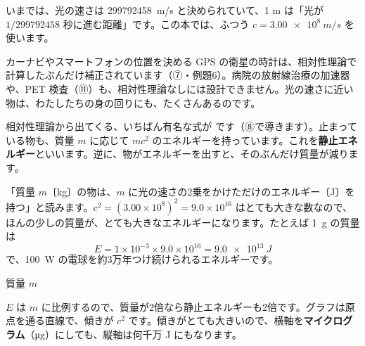 いまでは、光の速さは \qty{299792458}{m/s} と決められていて、1 m は「光が $1/\num{299792458}$ 秒に進む距離」です。この本では、ふつう $c=\qty{3.00e8}{m/s}$ を使います。

\begin{phmijika}
カーナビやスマートフォンの位置を決める GPS の衛星の時計は、相対性理論で計算したぶんだけ補正されています（⑦・例題6）。病院の放射線治療の加速器や、PET 検査（⑪）も、相対性理論なしには設計できません。光の速さに近い物は、わたしたちの身の回りにも、たくさんあるのです。
\end{phmijika}

\label{ph:原-11:sec2}
相対性理論から出てくる、いちばん有名な式が
です（⑧で導きます）。止まっている物も、質量 $m$ に応じて $mc^2$ のエネルギーを持っています。これを\textbf{静止エネルギー}といいます。逆に、物がエネルギーを出すと、そのぶんだけ質量が減ります。

\begin{phyomi}[$E=mc^2$]
「質量 $m$〔kg〕の物は、$m$ に光の速さの2乗をかけただけのエネルギー〔J〕を持つ」と読みます。$c^2=(3.00\times10^8)^2=9.0\times10^{16}$ はとても大きな数なので、ほんの少しの質量が、とても大きなエネルギーになります。たとえば \qty{1}{g} の質量は
\[ E=1\times10^{-3}\times9.0\times10^{16}=\qty{9.0e13}{J} \]
で、\qty{100}{W} の電球を約3万年つけ続けられるエネルギーです。
\end{phyomi}

\begin{phbaisuru}{質量 $m$}
\noindent\begin{minipage}[c]{0.5\linewidth}\raggedright
$E$ は $m$ に比例するので、質量が2倍なら静止エネルギーも2倍です。グラフは原点を通る直線で、傾きが $c^2$ です。傾きがとても大きいので、横軸を\textbf{マイクログラム}（\si{\micro g}）にしても、縦軸は何千万 J にもなります。
\end{minipage}\hfill
\begin{minipage}[c]{0.46\linewidth}\centering
{}
\end{minipage}
\end{phbaisuru}

